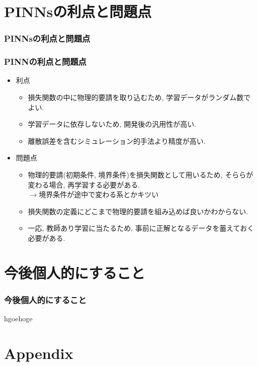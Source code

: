 \documentclass[xcolor=dvipsnames,hyperref={breaklinks=true},mathserif,professionalfont,dvipdfmx,12pt]{beamer}
\begin{document}
\section{PINNsの利点と問題点}
\begin{frame}
  \frametitle{PINNsの利点と問題点}
  \frametitle{PINNの利点と問題点}
  \begin{itemize}
    \item 利点
    \begin{itemize}
      \item 損失関数の中に物理的要請を取り込むため, 学習データがランダム数でよい. 
      \item 学習データに依存しないため, 開発後の汎用性が高い. 
      \item 離散誤差を含むシミュレーション的手法より精度が高い.
    \end{itemize}
    \item 問題点
    \begin{itemize}
      \item 物理的要請(初期条件, 境界条件)を損失関数として用いるため, そららが変わる場合, 再学習する必要がある.\\
      $\rightarrow$\quad 境界条件が途中で変わる系とかキツい
      \item 損失関数の定義にどこまで物理的要請を組み込めば良いかわからない.
      \item 一応, 教師あり学習に当たるため, 事前に正解となるデータを蓄えておく必要がある.
    \end{itemize}
  \end{itemize}
\end{frame}

\section{今後個人的にすること}
\begin{frame}
  \frametitle{今後個人的にすること}
  hgoehoge
\end{frame}

\section{Appendix}
\end{document}
